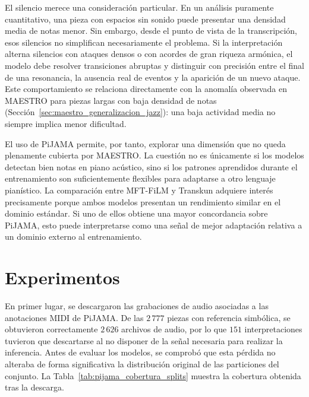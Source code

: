 \documentclass[11pt,spanish,listoffigures,listoftables]{tfgetsinf}
\begin{document}
El silencio merece una consideración particular. En un análisis puramente cuantitativo,
una pieza con espacios sin sonido puede presentar una densidad media de notas menor.
Sin embargo, desde el punto de vista de la transcripción, esos silencios no simplifican
necesariamente el problema. Si la interpretación alterna silencios con ataques densos o
con acordes de gran riqueza armónica, el modelo debe resolver transiciones abruptas y
distinguir con precisión entre el final de una resonancia, la ausencia real de eventos y
la aparición de un nuevo ataque. Este comportamiento se relaciona directamente con la anomalía observada
en MAESTRO para piezas largas con baja densidad de notas (Sección~\ref{sec:maestro_generalizacion_jazz}): una baja actividad media
no siempre implica menor dificultad.

El uso de PiJAMA permite, por tanto, explorar una dimensión que no queda plenamente
cubierta por MAESTRO. La cuestión no es únicamente si los modelos detectan bien notas
en piano acústico, sino si los patrones aprendidos durante el entrenamiento son
suficientemente flexibles para adaptarse a otro lenguaje pianístico. La comparación
entre MFT-FiLM y Transkun adquiere interés precisamente porque ambos modelos
presentan un rendimiento similar en el dominio estándar. Si uno de ellos obtiene una
mayor concordancia sobre PiJAMA, esto puede interpretarse como una señal de mejor
adaptación relativa a un dominio externo al entrenamiento.

\section{Experimentos}
\label{sec:experimentos_pijama}

En primer lugar, se descargaron las grabaciones de audio asociadas a las anotaciones
MIDI de PiJAMA. De las $2\,777$ piezas con referencia simbólica, se obtuvieron
correctamente $2\,626$ archivos de audio, por lo que $151$ interpretaciones tuvieron que
descartarse al no disponer de la señal necesaria para realizar la inferencia. Antes de
evaluar los modelos, se comprobó que esta pérdida no alteraba de forma significativa
la distribución original de las particiones del conjunto. La Tabla~\ref{tab:pijama_cobertura_splits}
muestra la cobertura obtenida tras la descarga.
\end{document}

